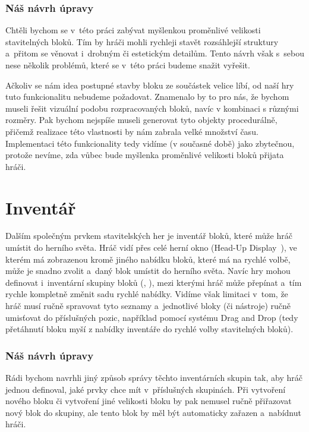 \subsubsection{Náš návrh úpravy}
Chtěli bychom se v~této práci zabývat myšlenkou proměnlivé velikosti stavitelných bloků. Tím by hráči mohli rychleji stavět rozsáhlejší struktury a~přitom se věnovat i~drobným či estetickým detailům. Tento návrh však s~sebou nese několik problémů, které se v~této práci budeme snažit vyřešit.

Ačkoliv se nám idea postupné stavby bloku ze součástek velice líbí, od naší hry tuto funkcionalitu nebudeme požadovat. Znamenalo by to pro nás, že bychom museli řešit vizuální podobu rozpracovaných bloků, navíc v kombinaci s různými rozměry. Pak bychom nejspíše museli generovat tyto objekty procedurálně, přičemž realizace této vlastnosti by nám zabrala velké množství času. Implementaci této funkcionality tedy vidíme (v současné době) jako zbytečnou, protože nevíme, zda vůbec bude myšlenka proměnlivé velikosti bloků přijata hráči.


\section{Inventář}
Dalším společným prvkem stavitelských her je inventář bloků, které může hráč umístit do herního světa. Hráč vidí přes celé herní okno \HUD{} (Head-Up Display~\citep{hud_terminology}), ve kterém má zobrazenou kromě jiného nabídku bloků, které má na rychlé volbě, může je snadno zvolit a~daný blok umístit do herního světa. Navíc hry mohou definovat i~inventární skupiny bloků (\SE{}, \ME{}), mezi kterými hráč může přepínat a~tím rychle kompletně změnit sadu rychlé nabídky. Vidíme však limitaci v~tom, že hráč musí ručně spravovat tyto seznamy a~jednotlivé bloky (či nástroje) ručně umisťovat do příslušných pozic, například pomocí systému Drag and Drop (tedy přetáhnutí bloku myší z nabídky inventáře do rychlé volby stavitelných bloků).


\subsubsection{Náš návrh úpravy}
Rádi bychom navrhli jiný způsob správy těchto inventárních skupin tak, aby hráč jednou definoval, jaké prvky chce mít v~příslušných skupinách. Při vytvoření nového bloku či vytvoření jiné velikosti bloku by pak nemusel ručně přiřazovat nový blok do skupiny, ale tento blok by měl být automaticky zařazen a~nabídnut hráči. 


